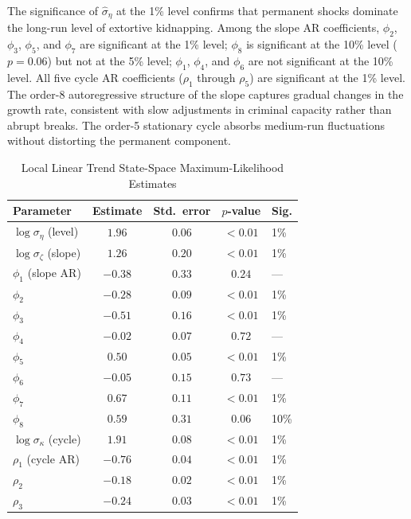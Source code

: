 \documentclass[ecta,nameyear,final,supplement]{econsocart}
\numberwithin{equation}{section}
\numberwithin{table}{section}
\theoremstyle{definition}
\begin{document}
The significance of $\hat\sigma_\eta$ at the 1\% level confirms that
permanent shocks dominate the long-run level of extortive kidnapping. Among
the slope AR coefficients, $\phi_2$, $\phi_3$, $\phi_5$, and $\phi_7$ are
significant at the 1\% level; $\phi_8$ is significant at the 10\% level
($p=0.06$) but not at the 5\% level; $\phi_1$, $\phi_4$, and $\phi_6$ are not
significant at the 10\% level. All five cycle AR coefficients ($\rho_1$
through $\rho_5$) are significant at the 1\% level. The order-8
autoregressive structure of the slope captures gradual changes in the growth
rate, consistent with slow adjustments in criminal capacity rather than
abrupt breaks. The order-5 stationary cycle absorbs medium-run fluctuations
without distorting the permanent component.

\begin{table}[t]
\centering
\caption{Local Linear Trend State-Space Maximum-Likelihood Estimates}
\label{tab:llt}
\begin{tabular}{lcccl}
\toprule
Parameter & Estimate & Std.\ error & $p$-value & Sig. \\
\midrule
$\log\sigma_\eta$ (level)      & $1.96$  & $0.06$ & $<0.01$ & 1\% \\
$\log\sigma_\zeta$ (slope)     & $1.26$  & $0.20$ & $<0.01$ & 1\% \\
$\phi_1$ (slope AR)            & $-0.38$ & $0.33$ & $0.24$  & --- \\
$\phi_2$                       & $-0.28$ & $0.09$ & $<0.01$ & 1\% \\
$\phi_3$                       & $-0.51$ & $0.16$ & $<0.01$ & 1\% \\
$\phi_4$                       & $-0.02$ & $0.07$ & $0.72$  & --- \\
$\phi_5$                       & $0.50$  & $0.05$ & $<0.01$ & 1\% \\
$\phi_6$                       & $-0.05$ & $0.15$ & $0.73$  & --- \\
$\phi_7$                       & $0.67$  & $0.11$ & $<0.01$ & 1\% \\
$\phi_8$                       & $0.59$  & $0.31$ & $0.06$  & 10\% \\
$\log\sigma_\kappa$ (cycle)    & $1.91$  & $0.08$ & $<0.01$ & 1\% \\
$\rho_1$ (cycle AR)            & $-0.76$ & $0.04$ & $<0.01$ & 1\% \\
$\rho_2$                       & $-0.18$ & $0.02$ & $<0.01$ & 1\% \\
$\rho_3$                       & $-0.24$ & $0.03$ & $<0.01$ & 1\% \\

\end{tabular}
\end{table}
\end{document}
